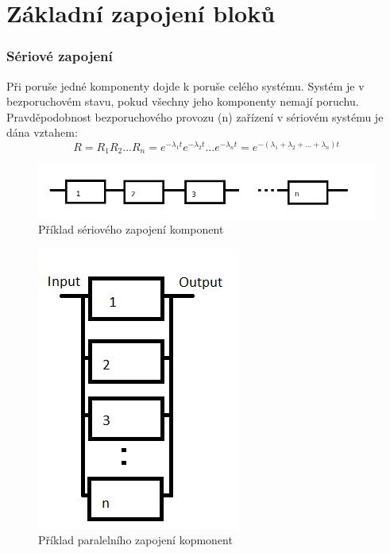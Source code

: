 \documentclass[FM,RP]{tulthesis}
\begin{document}
    \section*{Základní zapojení bloků}
        \subsubsection*{Sériové zapojení}
            Při poruše jedné komponenty dojde k poruše celého systému. 
            Systém je v bezporuchovém stavu, pokud všechny jeho komponenty nemají poruchu.\cite{5}
            Pravděpodobnost bezporuchového provozu (n) zařízení v sériovém systému je dána vztahem:
            $$ R = R_{1}R_{2}...R_{n} = e^{-\lambda_{1}t}e^{-\lambda_{2}t}...e^{-\lambda_{n}t} = e^{-(\lambda_{1} + \lambda_{2} + ... +\lambda_{n})t} $$
            \begin{figure}[h]
                \centering
                \includegraphics[scale=0.75]{pic/seriove.png}
                \caption{Příklad sériového zapojení komponent} 
            \end{figure}
            \begin{figure}
                \begin{center}
                    \includegraphics[scale=0.75]{pic/paralelni.png}
                    \caption{Příklad paralelního zapojení kopmonent} 
                \end{center}
            \end{figure}
\end{document}
